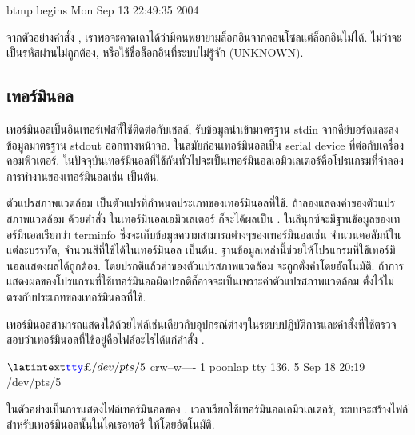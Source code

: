 \begin{thwbr}
\begin{MyExample}
\begin{MyEx}
btmp begins Mon Sep 13 22:49:35 2004
\end{MyEx}
\end{MyExample}%

จากตัวอย่างคำสั่ง , เราพอจะคาดเดาได้ว่ามีคนพยายามล็อกอินจากคอนโซลแต่ล็อกอินไม่ได้. ไม่ว่าจะเป็นรหัสผ่านไม่ถูกต้อง, หรือใช้ชื่อล็อกอินที่ระบบไม่รู้จัก (UNKNOWN).

\subsection{เทอร์มินอล}
เทอร์มินอลเป็นอินเทอร์เฟสที่ใช้ติดต่อกับเชลล์, รับข้อมูลนำเข้ามาตรฐาน stdin จากคีย์บอร์ดและส่งข้อมูลมาตรฐาน stdout ออกทางหน้าจอ. ในสมัยก่อนเทอร์มินอลเป็น serial device ที่ต่อกับเครื่องคอมพิวเตอร์. ในปัจจุบันเทอร์มินอลที่ใช้กันทั่วไปจะเป็นเทอร์มินอลเอมิวเลเตอร์คือโปรแกรมที่จำลองการทำงานของเทอร์มินอลเช่น  เป็นต้น.

ตัวแปรสภาพแวดล้อม  เป็นตัวแปรที่กำหนดประเภทของเทอร์มินอลที่ใช้. ถ้าลองแสดงค่าของตัวแปรสภาพแวดล้อม  ด้วยคำสั่ง  ในเทอร์มินอลเอมิวเลเตอร์  ก็จะได้ผลเป็น . ในลินุกซ์จะมีฐานข้อมูลของเทอร์มินอลเรียกว่า terminfo ซึ่งจะเก็บข้อมูลความสามารถต่างๆของเทอร์มินอลเช่น จำนวนคอลัมน์ในแต่ละบรรทัด, จำนวนสีที่ใช้ได้ในเทอร์มินอล เป็นต้น. ฐานข้อมูลเหล่านี้ช่วยให้โปรแกรมที่ใช้เทอร์มินอลแสดงผลได้ถูกต้อง. โดยปรกติแล้วค่าของตัวแปรสภาพแวดล้อม  จะถูกตั้งค่าโดยอัตโนมัติ. ถ้าการแสดงผลของโปรแกรมที่ใช้เทอร์มินอลผิดปรกติก็อาจจะเป็นเพราะค่าตัวแปรสภาพแวดล้อม  ตั้งไว้ไม่ตรงกับประเภทของเทอร์มินอลที่ใช้. 

เทอร์มินอลสามารถแสดงได้ด้วยไฟล์เช่นเดียวกับอุปกรณ์ต่างๆในระบบปฏิบัติการและคำสั่งที่ใช้ตรวจสอบว่าเทอร์มินอลที่ใช้อยู่คือไฟล์อะไรได้แก่คำสั่ง . 
\begin{MyExample}
\begin{MyEx}
$ \cin{tty}
/dev/pts/5
$ 
crw--w----    1 poonlap  tty      136,   5 Sep 18 20:19 /dev/pts/5
\end{MyEx}
\end{MyExample}
ในตัวอย่างเป็นการแสดงไฟล์เทอร์มินอลของ . เวลาเรียกใช้เทอร์มินอลเอมิวเลเตอร์, ระบบจะสร้างไฟล์สำหรับเทอร์มินอลนั้นในไดเรอทอรี  ให้โดยอัตโนมัติ. 


\end{thwbr}
